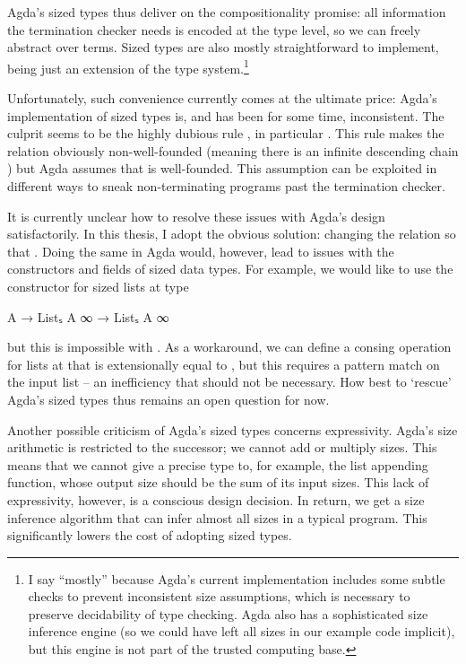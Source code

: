 Agda's sized types thus deliver on the compositionality promise: all information
the termination checker needs is encoded at the type level, so we can freely
abstract over terms. Sized types are also mostly straightforward to implement,
being just an extension of the type system.\footnote{I say \enquote{mostly}
  because Agda's current implementation includes some subtle checks to prevent
  inconsistent size assumptions, which is necessary to preserve decidability of
  type checking. Agda also has a sophisticated size inference engine (so we
  could have left all sizes in our example code implicit), but this engine is
  not part of the trusted computing base.}

Unfortunately, such convenience currently comes at the ultimate price: Agda's
implementation of sized types is, and has been for some time, inconsistent. The
culprit seems to be the highly dubious rule , in particular
. This rule makes the \icode{<} relation obviously non-well-founded
(meaning there is an infinite descending chain ) but Agda
assumes that \icode{<} is well-founded. This assumption can be exploited in
different ways \cite{agdabug2015,agdabug2016,agdabug2017,agdabug2018} to sneak
non-terminating programs past the termination checker.

It is currently unclear how to resolve these issues with Agda's design
satisfactorily. In this thesis, I adopt the obvious solution: changing the
\icode{<} relation so that . Doing the same in Agda would, however,
lead to issues with the constructors and fields of sized data types. For
example, we would like to use the  constructor for sized lists at
type
\begin{code}
  A → Listₛ A ∞ → Listₛ A ∞
\end{code}
but this is impossible with . As a workaround, we can define a
consing operation for lists at  that is extensionally equal to
, but this requires a pattern match on the input list -- an
inefficiency that should not be necessary. How best to \enquote*{rescue} Agda's
sized types thus remains an open question for now.

Another possible criticism of Agda's sized types concerns expressivity. Agda's
size arithmetic is restricted to the successor; we cannot add or multiply sizes.
This means that we cannot give a precise type to, for example, the list
appending function, whose output size should be the sum of its input sizes. This
lack of expressivity, however, is a conscious design decision. In return, we get
a size inference algorithm that can infer almost all sizes in a typical program.
This significantly lowers the cost of adopting sized types.
